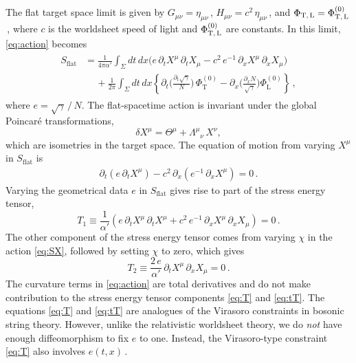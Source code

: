 \documentclass[11pt]{article}
\newcommand{\be}{\begin{equation}}
\newcommand{\ee}{\end{equation}}
\newcommand{\lr}{\left (}
\newcommand{\rr}{\right )}
\newcommand{\p}{\partial}
\begin{document}
The flat target space limit is given by $G_{\mu\nu} = \eta_{\mu\nu}$\,, $H_{\mu\nu} =  c^2 \, \eta_{\mu\nu}$\,, and $\Phi_\text{T,\,L} = \Phi^{(0)}_\text{T,\,L}$\,, where $c$ is the worldsheet speed of light and $\Phi^{(0)}_\text{T,\,L}$ are constants. In this limit, \eqref{eq:action} becomes
%
\begin{align} \label{eq:flat}
\begin{split}
	S_\text{flat} & = \frac{1}{4\pi \alpha'} \int_\Sigma dt \, dx \Bigr( e \, \p_t X^\mu \, \p_t X_\mu - c^2 \, e^{-1} \, \p_x X^\mu \, \p_x X_\mu \Bigr) \\[2pt]
		& \quad\, + \frac{1}{2\pi} \int_\Sigma dt \, dx \left\{ \p_t \biggl( \frac{\p_t \sqrt{\gamma}}{N} \biggr)\, \Phi^{(0)}_\text{T} - \p_x \biggl( \frac{ \p_x N }{\sqrt{\gamma}} \biggr) \Phi^{(0)}_\text{L} \right\} \,,
\end{split}
\end{align}
%
where $e = \sqrt{\gamma} \, / \, N$.
The flat-spacetime action is invariant under the global Poincar\'{e} transformations,
%
\be
	\delta X^\mu = \Theta^\mu + \Lambda^\mu{}_\nu \, X^\nu,
\ee
%
which are isometries in the target space. The equation of motion from varying $X^\mu$ in $S_\text{flat}$ is
%
\begin{align}
	\p_t \lr e \, \p_t X^\mu \rr - c^2 \, \p_x \lr e^{-1} \, \p_x X^\mu \rr = 0\,.
\end{align}
%
Varying the geometrical data $e$ in $S_\text{flat}$ gives rise to part of the stress energy tensor,
%
\be \label{eq:T}
	T_1 \equiv \frac{1}{\alpha'} \lr e \, \p_t X^\mu \, \p_t X^\mu + c^2 \, e^{-1} \, \p_x X^\mu \, \p_x X_\mu \rr = 0\,.
\ee
%
The other component of the stress energy tensor comes from varying $\chi$ in the action \eqref{eq:SX}, followed by setting $\chi$ to zero, which gives
%
\be \label{eq:tT}
	T_2 \equiv \frac{2 \, e}{\alpha'} \, \p_t X^\mu \, \p_x X_\mu = 0\,.
\ee
%
The curvature terms in \eqref{eq:action} are total derivatives and do not make contribution to  the stress energy tensor components \eqref{eq:T} and \eqref{eq:tT}.
The equations \eqref{eq:T} and \eqref{eq:tT} are analogues of the Virasoro constraints in bosonic string theory. However, unlike the relativistic worldsheet theory, we do \emph{not} have enough diffeomorphism to fix $e$ to one.  Instead, the Virasoro-type constraint \eqref{eq:T} also involves $e (t, x)$\,.
\end{document}

